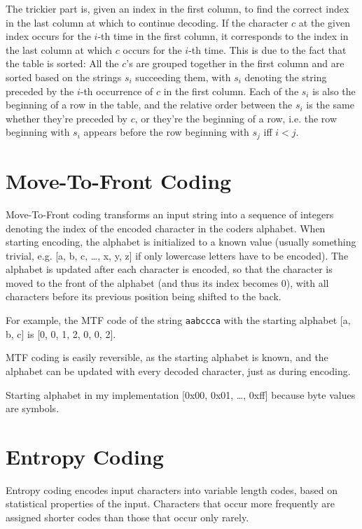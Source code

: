 \documentclass[a4paper]{scrreprt}
\begin{document}
The trickier part is, given an index in the first column, to find the correct
index in the last column at which to continue decoding. If the character \(c\)
at the given index occurs for the \(i\)-th time in the first column, it
corresponds to the index in the last column at which \(c\) occurs for the
\(i\)-th time. This is due to the fact that the table is sorted: All the \(c\)'s
are grouped together in the first column and are sorted based on the strings
\(s_i\) succeeding them, with \(s_i\) denoting the string preceded by the
\(i\)-th occurrence of \(c\) in the first column. Each of the \(s_i\) is also
the beginning of a row in the table, and the relative order between the \(s_i\)
is the same whether they're preceded by \(c\), or they're the beginning of a
row, i.e. the row beginning with \(s_i\) appears before the row beginning with
\(s_j\) iff \(i<j\).


\section{Move-To-Front Coding}

Move-To-Front coding transforms an input string into a sequence of integers
denoting the index of the encoded character in the coders alphabet. When
starting encoding, the alphabet is initialized to a known value (usually
something trivial, e.g. [a, b, c, \ldots, x, y, z] if only lowercase letters
have to be encoded). The alphabet is updated after each character is encoded, so
that the character is moved to the front of the alphabet (and thus its index
becomes 0), with all characters before its previous position being shifted to
the back.

For example, the MTF code of the string \texttt{aabccca} with the starting
alphabet [a, b, c] is [0, 0, 1, 2, 0, 0, 2].

MTF coding is easily reversible, as the starting alphabet is known, and the
alphabet can be updated with every decoded character, just as during encoding.

Starting alphabet in my implementation [0x00, 0x01, \ldots, 0xff] because byte
values are symbols.

\section{Entropy Coding}

Entropy coding encodes input characters into variable length codes, based on
statistical properties of the input. Characters that occur more frequently are
assigned shorter codes than those that occur only rarely.
\end{document}
